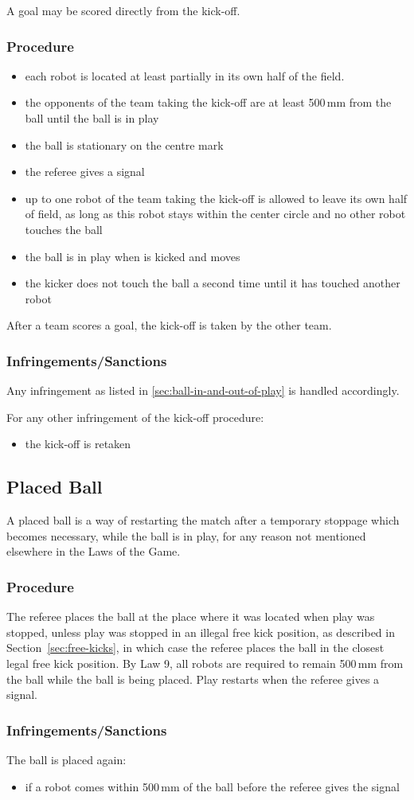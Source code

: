 A goal may be scored directly from the kick-off.

\subsubsection{Procedure}
\begin{itemize}
\item each robot is located at least partially in its own half of the field.
\item the opponents of the team taking the kick-off are at least 500\,mm from the ball until the ball is in play
\item the ball is stationary on the centre mark
\item the referee gives a signal
\item up to one robot of the team taking the kick-off is allowed to leave its own half of field,
as long as this robot stays within the center circle and no other robot touches the ball
\item the ball is in play when is kicked and moves
\item the kicker does not touch the ball a second time until it has touched another robot
\end{itemize}

After a team scores a goal, the kick-off is taken by the other team.

\subsubsection{Infringements/Sanctions}
Any infringement as listed in \autoref{sec:ball-in-and-out-of-play} is handled accordingly.

For any other infringement of the kick-off procedure:
\begin{itemize}
\item the kick-off is retaken
\end{itemize}

\subsection{Placed Ball}
\label{sec:placedBall}
A placed ball is a way of restarting the match after a temporary stoppage which becomes necessary, while the ball is in play, for any reason not mentioned elsewhere in the Laws of the Game.

\subsubsection{Procedure}
The referee places the ball at the place where it was located when play was stopped, unless
play was stopped in an illegal free kick position, as described in Section~\ref{sec:free-kicks},
in which case the referee places the ball in the closest legal free kick position.
By Law 9, all robots are required to remain 500\,mm from the ball while the ball is being placed.
Play restarts when the referee gives a signal.

\subsubsection{Infringements/Sanctions}
The ball is placed again:
\begin{itemize}
\item if a robot comes within 500\,mm of the ball before the referee gives the signal
\end{itemize}
